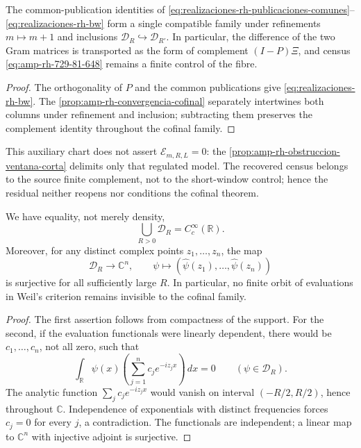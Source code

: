 \begin{proposition}
\label{prop:amp-rh-compatibilidad-complemento-finito}
\label{prop:amp-rh-residual}
The common-publication identities of \eqref{eq:realizaciones-rh-publicaciones-comunes}--\eqref{eq:realizaciones-rh-bw} form a single compatible family under refinements \(m\mapsto m+1\) and inclusions \(\mathcal D_R\hookrightarrow\mathcal D_{R'}\). In particular, the difference of the two Gram matrices is transported as the form of complement \((I-P)\Xi\), and census \eqref{eq:amp-rh-729-81-648} remains a finite control of the fibre.
\end{proposition}

\begin{proof}
The orthogonality of \(P\) and the common publications give \eqref{eq:realizaciones-rh-bw}. The \cref{prop:amp-rh-convergencia-cofinal} separately intertwines both columns under refinement and inclusion; subtracting them preserves the complement identity throughout the cofinal family.
\end{proof}

This auxiliary chart does not assert \(\mathcal E_{m,R,L}=0\): the \cref{prop:amp-rh-obstruccion-ventana-corta} delimits only that regulated model. The recovered census belongs to the source finite complement, not to the short-window control; hence the residual neither reopens nor conditions the cofinal theorem.

\begin{lemma}
\label{lem:amp-rh-separacion-cofinal}
We have equality, not merely density,
\[
 \bigcup_{R>0}\mathcal D_R=C_c^\infty(\mathbb R).
\]
Moreover, for any distinct complex points \(z_1,\ldots,z_n\), the map
\[
 \mathcal D_R\longrightarrow\mathbb C^n,\qquad
 \psi\longmapsto
 (\widehat\psi(z_1),\ldots,\widehat\psi(z_n))
\]
is surjective for all sufficiently large \(R\). In particular, no finite orbit of evaluations in Weil's criterion remains invisible to the cofinal family.
\end{lemma}

\begin{proof}
The first assertion follows from compactness of the support. For the second, if the evaluation functionals were linearly dependent, there would be \(c_1,\ldots,c_n\), not all zero, such that
\[
 \int_{\mathbb R}\psi(x)
 \left(\sum_{j=1}^nc_je^{-iz_jx}\right)\,dx=0
 \qquad(\psi\in\mathcal D_R).
\]
The analytic function \(\sum_jc_je^{-iz_jx}\) would vanish on interval \((-R/2,R/2)\), hence throughout \(\mathbb C\). Independence of exponentials with distinct frequencies forces \(c_j=0\) for every \(j\), a contradiction. The functionals are independent; a linear map to \(\mathbb C^n\) with injective adjoint is surjective.
\end{proof}

